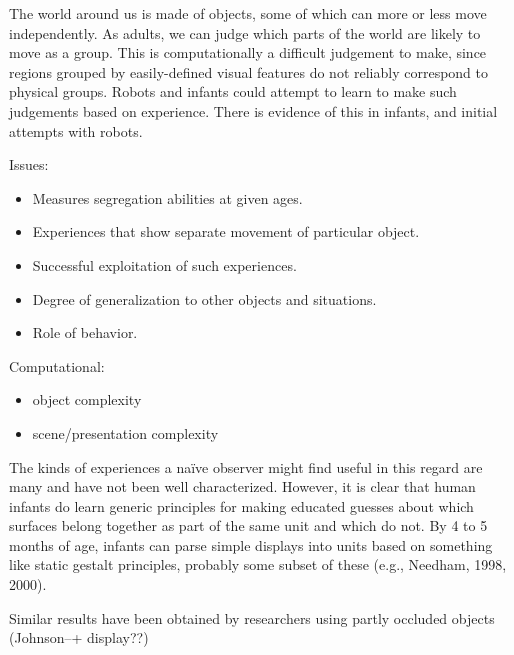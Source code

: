 


The world around us is made of objects, some of which can more or less
move independently. As adults, we can judge which parts of the world
are likely to move as a group. This is computationally a difficult
judgement to make, since regions grouped by easily-defined visual
features do not reliably correspond to physical groups. Robots and
infants could attempt to learn to make such judgements based on
experience. There is evidence of this in infants, and initial attempts
with robots.


Issues:

\begin{itemize}

\item Measures segregation abilities at given ages.

\item Experiences that show separate movement of particular object.

\item Successful exploitation of such experiences.

\item Degree of generalization to other objects and situations.

\item Role of behavior.

\end{itemize}

Computational:

\begin{itemize}

\item object complexity

\item scene/presentation complexity

\end{itemize}

The kinds of experiences a na\"{i}ve observer might find
useful in this regard are many and have not been well characterized.
However, it is clear that human infants do learn generic principles
for making educated guesses about which surfaces belong together as
part of the same unit and which do not.  By 4 to 5 months of age,
infants can parse simple displays into units based on something like
static gestalt principles, probably some subset of these (e.g.,
Needham, 1998, 2000).

Similar results have been obtained by researchers using partly
occluded objects (Johnson--+ display??)


